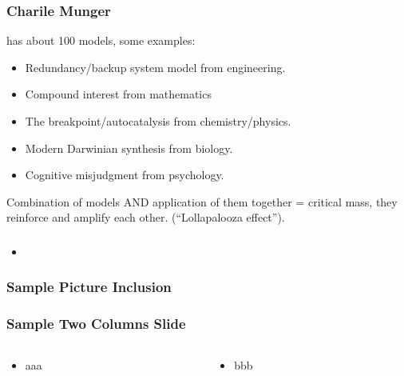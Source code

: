 \begin{frame}[fragile]\frametitle{Charile Munger}

has about 100 models, some examples:

\begin{itemize}
\item Redundancy/backup system model from engineering.
\item Compound interest from mathematics
\item The breakpoint/autocatalysis from chemistry/physics.
\item Modern Darwinian synthesis from biology.
\item Cognitive misjudgment from psychology.
\end{itemize}

Combination of models AND application of them together = critical mass, they reinforce and amplify each other. (“Lollapalooza effect”).

\end{frame}


\begin{frame}[fragile]\frametitle{}
\begin{itemize}
\item 
\end{itemize}
\end{frame}

\begin{frame}[fragile]\frametitle{Sample Picture Inclusion}

\end{frame}


\begin{frame}[fragile]\frametitle{Sample Two Columns Slide}
\begin{columns}
    \begin{column}[T]{0.6\linewidth}
      \begin{itemize}
		\item aaa
	  \end{itemize}

    \end{column}
    \begin{column}[T]{0.4\linewidth}
      \begin{itemize}
		\item bbb
	  \end{itemize}
    \end{column}
  \end{columns}
\end{frame}

